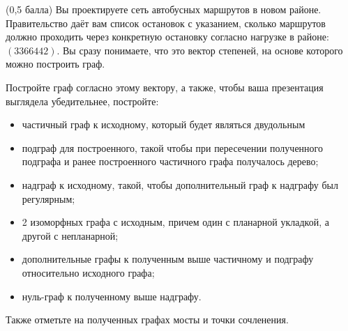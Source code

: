 \question
(0,5 балла) Вы проектируете сеть автобусных маршрутов в новом районе. Правительство даёт вам список остановок с указанием, сколько маршрутов должно проходить через конкретную остановку согласно нагрузке в районе: $(3 3 6 6 4 4 2)$. Вы сразу понимаете, что это вектор степеней, на основе которого можно построить граф.

Постройте граф согласно этому вектору, а также, чтобы ваша презентация выглядела убедительнее, постройте:

\begin{itemize}
\item частичный граф к исходному, который будет являться двудольным
\item подграф для построенного, такой чтобы при пересечении полученного подграфа и ранее построенного частичного графа получалось дерево;
\item надграф к исходному, такой, чтобы дополнительный граф к надграфу был регулярным;
\item 2 изоморфных графа с исходным, причем один с планарной укладкой, а другой с непланарной;
\item дополнительные графы к полученным выше частичному и подграфу относительно исходного графа;
\item нуль-граф к полученному выше надграфу.
\end{itemize}

Также отметьте на полученных графах мосты и точки сочленения.
